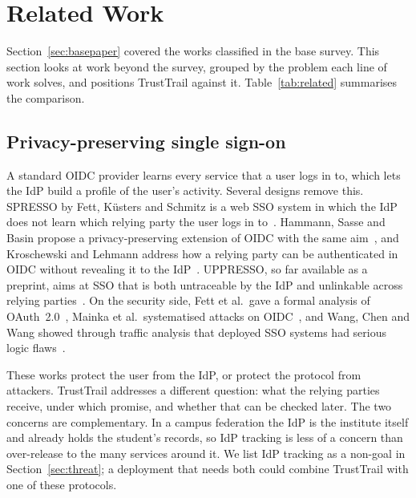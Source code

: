 \section{Related Work}
\label{sec:related}

Section~\ref{sec:basepaper} covered the works classified in the base survey. This section looks at work beyond the survey, grouped by the problem each line of work solves, and positions TrustTrail against it. Table~\ref{tab:related} summarises the comparison.

\subsection{Privacy-preserving single sign-on}
A standard OIDC provider learns every service that a user logs in to, which lets the IdP build a profile of the user's activity. Several designs remove this. SPRESSO by Fett, Küsters and Schmitz is a web SSO system in which the IdP does not learn which relying party the user logs in to~\cite{fett2015spresso}. Hammann, Sasse and Basin propose a privacy-preserving extension of OIDC with the same aim~\cite{hammann2020privacy}, and Kroschewski and Lehmann address how a relying party can be authenticated in OIDC without revealing it to the IdP~\cite{kroschewski2023implicit}. UPPRESSO, so far available as a preprint, aims at SSO that is both untraceable by the IdP and unlinkable across relying parties~\cite{guo2021uppresso}. On the security side, Fett et al.\ gave a formal analysis of OAuth~2.0~\cite{fett2016oauth}, Mainka et al.\ systematised attacks on OIDC~\cite{mainka2017sok}, and Wang, Chen and Wang showed through traffic analysis that deployed SSO systems had serious logic flaws~\cite{wang2012signing}.

These works protect the user from the IdP, or protect the protocol from attackers. TrustTrail addresses a different question: what the relying parties receive, under which promise, and whether that can be checked later. The two concerns are complementary. In a campus federation the IdP is the institute itself and already holds the student's records, so IdP tracking is less of a concern than over-release to the many services around it. We list IdP tracking as a non-goal in Section~\ref{sec:threat}; a deployment that needs both could combine TrustTrail with one of these protocols.

